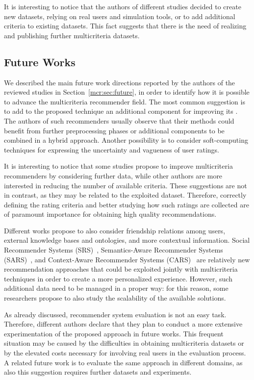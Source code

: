 It is interesting to notice that the authors of different studies decided to create new datasets, relying on real users and simulation tools, or to add additional criteria to existing datasets. This fact suggests that there is the need of realizing and publishing further multicriteria datasets.

\subsection{Future Works}

We described the main future work directions reported by the authors of the reviewed studies in Section~\ref{mcr:sec:future}, in order to identify how it is possible to advance the multicriteria recommender field. The most common suggestion is to add to the proposed technique an additional component for improving its . The authors of such recommenders usually observe that their methods could benefit from further preprocessing phases or additional components to be combined in a hybrid approach. Another possibility is to consider soft-computing techniques for expressing the uncertainty and vagueness of user ratings.

It is interesting to notice that some studies propose to improve multicriteria recommenders by considering further data, while other authors are more interested in reducing the number of available criteria. These suggestions are not in contrast, as they may be related to the exploited dataset. Therefore, correctly defining the rating criteria and better studying how such ratings are collected are of paramount importance for obtaining high quality recommendations.

Different works propose to also consider friendship relations among users, external knowledge bases and ontologies, and more contextual information. Social Recommender Systems (SRS)~\cite{Guy2015}, Semantics-Aware Recommender Systems (SARS)~\cite{Gemmis2015a}, and Context-Aware Recommender Systems (CARS)~\cite{Adomavicius2015a} are relatively new recommendation approaches that could be exploited jointly with multicriteria techniques in order to create a more personalized experience. However, such additional data need to be managed in a proper way: for this reason, some researchers propose to also study the scalability of the available solutions.

As already discussed, recommender system evaluation is not an easy task. Therefore, different authors declare that they plan to conduct a more extensive experimentation of the proposed approach in future works. This frequent situation may be caused by the difficulties in obtaining multicriteria datasets or by the elevated costs necessary for involving real users in the evaluation process. A related future work is to evaluate the same approach in different domains, as also this suggestion requires further datasets and experiments.

